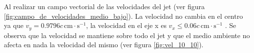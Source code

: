 \documentclass[12pt,a4paper]{book}
\begin{document}
Al realizar un campo vectorial de las velocidades del jet (ver figura \ref{fig:campo_de_velocidades_medio_bajo}). La velocidad no cambia en el centro ya que $v_{y} = 0.9796 c \, \mathrm{cm} \cdot \mathrm{s}^{-1}$, la velocidad en el eje x es $v_{x} \leq 0.06 c \, \mathrm{cm} \cdot \mathrm{s}^{-1}$ . Se observa que la velocidad se mantiene sobre todo el jet y que el medio ambiente no afecta en nada la velocidad del mismo (ver figura \ref{fig:vel_10_10}).


\begin{figure}
\centering
{}

\end{figure}
\end{document}
